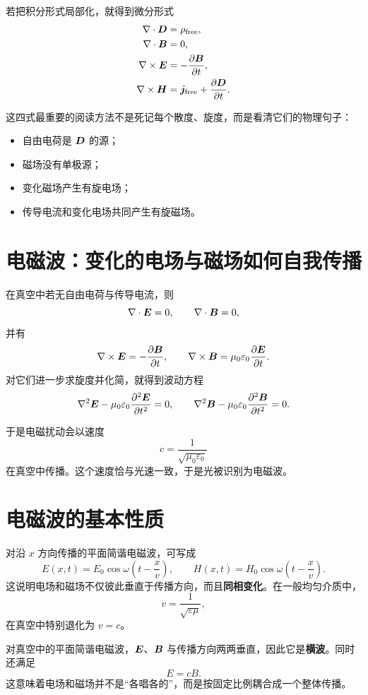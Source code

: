 \documentclass[lang=cn,11pt]{elegantbook}
\begin{document}
若把积分形式局部化，就得到微分形式
\begin{align*}
\nabla\cdot \vb*{D}&=\rho_{\mathrm{free}},\\
\nabla\cdot \vb*{B}&=0,\\
\nabla\times \vb*{E}&=-\pdv{\vb*{B}}{t},\\
\nabla\times \vb*{H}&=\vb*{j}_{\mathrm{free}}+\pdv{\vb*{D}}{t}.
\end{align*}

这四式最重要的阅读方法不是死记每个散度、旋度，而是看清它们的物理句子：
\begin{itemize}
  \item 自由电荷是 \(\vb*{D}\) 的源；
  \item 磁场没有单极源；
  \item 变化磁场产生有旋电场；
  \item 传导电流和变化电场共同产生有旋磁场。
\end{itemize}

\section{电磁波：变化的电场与磁场如何自我传播}

在真空中若无自由电荷与传导电流，则
\[
\nabla\cdot \vb*{E}=0,\qquad
\nabla\cdot \vb*{B}=0,
\]
并有
\[
\nabla\times \vb*{E}=-\pdv{\vb*{B}}{t},
\qquad
\nabla\times \vb*{B}=\mu_0\varepsilon_0\pdv{\vb*{E}}{t}.
\]
对它们进一步求旋度并化简，就得到波动方程
\[
\nabla^2 \vb*{E}-\mu_0\varepsilon_0\pdv[2]{\vb*{E}}{t}=0,
\qquad
\nabla^2 \vb*{B}-\mu_0\varepsilon_0\pdv[2]{\vb*{B}}{t}=0.
\]

于是电磁扰动会以速度
\[
c=\frac{1}{\sqrt{\mu_0\varepsilon_0}}
\]
在真空中传播。这个速度恰与光速一致，于是光被识别为电磁波。

\section{电磁波的基本性质}

对沿 \(x\) 方向传播的平面简谐电磁波，可写成
\[
E(x,t)=E_0\cos\omega\left(t-\frac{x}{v}\right),
\qquad
H(x,t)=H_0\cos\omega\left(t-\frac{x}{v}\right).
\]
这说明电场和磁场不仅彼此垂直于传播方向，而且\textbf{同相变化}。在一般均匀介质中，
\[
v=\frac{1}{\sqrt{\varepsilon\mu}},
\]
在真空中特别退化为 \(v=c\)。

对真空中的平面简谐电磁波，\(\vb*{E}\)、\(\vb*{B}\) 与传播方向两两垂直，因此它是\textbf{横波}。同时还满足
\[
E=cB.
\]
这意味着电场和磁场并不是“各唱各的”，而是按固定比例耦合成一个整体传播。
\end{document}
